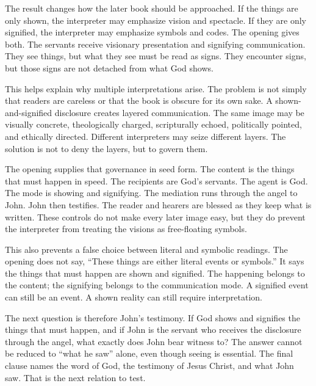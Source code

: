 The result changes how the later book should be approached. If the things are only shown, the interpreter may emphasize vision and spectacle. If they are only signified, the interpreter may emphasize symbols and codes. The opening gives both. The servants receive visionary presentation and signifying communication. They see things, but what they see must be read as signs. They encounter signs, but those signs are not detached from what God shows.

This helps explain why multiple interpretations arise. The problem is not simply that readers are careless or that the book is obscure for its own sake. A shown-and-signified disclosure creates layered communication. The same image may be visually concrete, theologically charged, scripturally echoed, politically pointed, and ethically directed. Different interpreters may seize different layers. The solution is not to deny the layers, but to govern them.

The opening supplies that governance in seed form. The content is the things that must happen in speed. The recipients are God's servants. The agent is God. The mode is showing and signifying. The mediation runs through the angel to John. John then testifies. The reader and hearers are blessed as they keep what is written. These controls do not make every later image easy, but they do prevent the interpreter from treating the visions as free-floating symbols.

This also prevents a false choice between literal and symbolic readings. The opening does not say, ``These things are either literal events or symbols.'' It says the things that must happen are shown and signified. The happening belongs to the content; the signifying belongs to the communication mode. A signified event can still be an event. A shown reality can still require interpretation.

The next question is therefore John's testimony. If God shows and signifies the things that must happen, and if John is the servant who receives the disclosure through the angel, what exactly does John bear witness to? The answer cannot be reduced to ``what he saw'' alone, even though seeing is essential. The final clause names the word of God, the testimony of Jesus Christ, and what John saw. That is the next relation to test.

